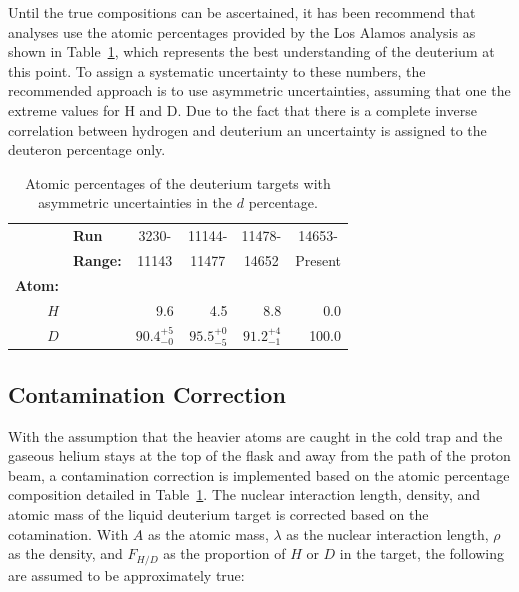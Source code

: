 Until the true compositions can be ascertained, it has been recommend that analyses use the atomic percentages provided by the Los Alamos analysis as shown in Table~\ref{tab:deut-atomic-perc}, which represents the best understanding of the deuterium at this point. To assign a systematic uncertainty to these numbers, the recommended approach is to use asymmetric uncertainties, assuming that one the extreme values for H and D. Due to the fact that there is a complete inverse correlation between hydrogen and deuterium an uncertainty is assigned to the deuteron percentage only.

\begin{table}
	\centering
	\begin{tabular}{@{}rlrrrr@{}}
		\toprule
		{} & \textbf{Run} & \multicolumn{1}{c}{3230-} & \multicolumn{1}{c}{11144-} &  \multicolumn{1}{c}{11478-} & \multicolumn{1}{c}{14653-}  \\ 
		{} & \textbf{Range:} & \multicolumn{1}{c}{11143} & \multicolumn{1}{c}{11477} &  \multicolumn{1}{c}{14652} & \multicolumn{1}{c}{Present} \\ 
		\textbf{Atom:} & & & & & \\ \midrule
		$H$	& & 9.6   & 4.5  & 8.8 & 0.0 \\
		$D$    & & $90.4^{+5}_{-0}$ & $95.5^{+0}_{-5}$  & $91.2^{+4}_{-1}$ & 100.0 \\
		\bottomrule
	\end{tabular}
	\caption{Atomic percentages of the deuterium targets with asymmetric uncertainties in the $d$ percentage.}
	\label{tab:deut-atomic-perc}
\end{table}

\subsection{Contamination Correction}

With the assumption that the heavier atoms are caught in the cold trap and the gaseous helium stays at the top of the flask and away from the path of the proton beam, a contamination correction is implemented based on the atomic percentage composition detailed in Table~\ref{tab:deut-atomic-perc}. The nuclear interaction length, density, and atomic mass of the liquid deuterium target is corrected based on the cotamination. With $A$ as the atomic mass, $\lambda$ as the nuclear interaction length, $\rho$ as the density, and $F_{H/D}$ as the proportion of $H$ or $D$ in the target, the following are assumed to be approximately true:

